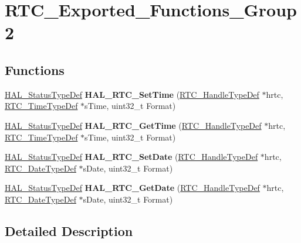 \hypertarget{group___r_t_c___exported___functions___group2}{}\section{R\+T\+C\+\_\+\+Exported\+\_\+\+Functions\+\_\+\+Group2}
\label{group___r_t_c___exported___functions___group2}
\subsection*{Functions}
\begin{DoxyCompactItemize}
\item 
\hyperlink{stm32f4xx__hal__def_8h_a63c0679d1cb8b8c684fbb0632743478f}{H\+A\+L\+\_\+\+Status\+Type\+Def} {\bfseries H\+A\+L\+\_\+\+R\+T\+C\+\_\+\+Set\+Time} (\hyperlink{struct_r_t_c___handle_type_def}{R\+T\+C\+\_\+\+Handle\+Type\+Def} $\ast$hrtc, \hyperlink{struct_r_t_c___time_type_def}{R\+T\+C\+\_\+\+Time\+Type\+Def} $\ast$s\+Time, uint32\+\_\+t Format)\hypertarget{group___r_t_c___exported___functions___group2_gafe0fed98171a564decd2a6c9be9781d8}{}\label{group___r_t_c___exported___functions___group2_gafe0fed98171a564decd2a6c9be9781d8}

\item 
\hyperlink{stm32f4xx__hal__def_8h_a63c0679d1cb8b8c684fbb0632743478f}{H\+A\+L\+\_\+\+Status\+Type\+Def} {\bfseries H\+A\+L\+\_\+\+R\+T\+C\+\_\+\+Get\+Time} (\hyperlink{struct_r_t_c___handle_type_def}{R\+T\+C\+\_\+\+Handle\+Type\+Def} $\ast$hrtc, \hyperlink{struct_r_t_c___time_type_def}{R\+T\+C\+\_\+\+Time\+Type\+Def} $\ast$s\+Time, uint32\+\_\+t Format)\hypertarget{group___r_t_c___exported___functions___group2_gae478ca2647e8d2f7dd1828ce43889a9e}{}\label{group___r_t_c___exported___functions___group2_gae478ca2647e8d2f7dd1828ce43889a9e}

\item 
\hyperlink{stm32f4xx__hal__def_8h_a63c0679d1cb8b8c684fbb0632743478f}{H\+A\+L\+\_\+\+Status\+Type\+Def} {\bfseries H\+A\+L\+\_\+\+R\+T\+C\+\_\+\+Set\+Date} (\hyperlink{struct_r_t_c___handle_type_def}{R\+T\+C\+\_\+\+Handle\+Type\+Def} $\ast$hrtc, \hyperlink{struct_r_t_c___date_type_def}{R\+T\+C\+\_\+\+Date\+Type\+Def} $\ast$s\+Date, uint32\+\_\+t Format)\hypertarget{group___r_t_c___exported___functions___group2_ga6cf6c70227337a564ccef82f64d6268f}{}\label{group___r_t_c___exported___functions___group2_ga6cf6c70227337a564ccef82f64d6268f}

\item 
\hyperlink{stm32f4xx__hal__def_8h_a63c0679d1cb8b8c684fbb0632743478f}{H\+A\+L\+\_\+\+Status\+Type\+Def} {\bfseries H\+A\+L\+\_\+\+R\+T\+C\+\_\+\+Get\+Date} (\hyperlink{struct_r_t_c___handle_type_def}{R\+T\+C\+\_\+\+Handle\+Type\+Def} $\ast$hrtc, \hyperlink{struct_r_t_c___date_type_def}{R\+T\+C\+\_\+\+Date\+Type\+Def} $\ast$s\+Date, uint32\+\_\+t Format)\hypertarget{group___r_t_c___exported___functions___group2_ga07ec2e43a305aa55e8c2442a349fc505}{}\label{group___r_t_c___exported___functions___group2_ga07ec2e43a305aa55e8c2442a349fc505}

\end{DoxyCompactItemize}


\subsection{Detailed Description}
